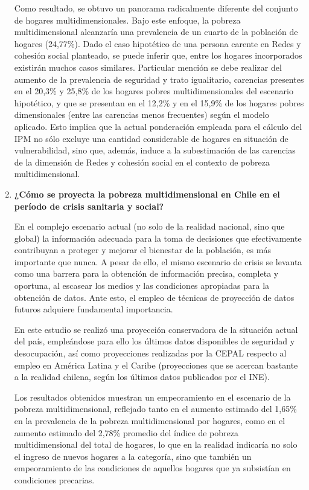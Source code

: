 \documentclass[12pt,letterpaper,spanish]{article}
\begin{document}
\begin{enumerate}
Como resultado, se obtuvo un panorama radicalmente diferente del conjunto de hogares multidimensionales. Bajo este enfoque, la pobreza multidimensional alcanzaría una prevalencia de un cuarto de la población de hogares (24,77\%). Dado el caso hipotético de una persona carente en Redes y cohesión social planteado, se puede inferir que, entre los hogares incorporados existirán muchos casos  similares. Particular mención se debe realizar del aumento de la prevalencia de seguridad y trato igualitario, carencias presentes  en el 20,3\% y 25,8\% de los hogares pobres multidimensionales del escenario hipotético, y que se presentan en el 12,2\% y en el 15,9\% de los hogares pobres dimensionales (entre las carencias menos frecuentes) según el modelo aplicado. Esto implica que la actual ponderación empleada para el cálculo del IPM no sólo excluye una cantidad considerable de hogares en situación de vulnerabilidad, sino que, además, induce a la subestimación de las carencias de la dimensión de Redes y cohesión social en el contexto de pobreza multidimensional.



\item \textbf{¿Cómo se proyecta la pobreza multidimensional en Chile en el período de crisis sanitaria y social?}

En el complejo escenario actual (no solo de la realidad nacional, sino que global) la información adecuada  para la toma de decisiones que efectivamente contribuyan a proteger y mejorar el bienestar de la población, es más importante que nunca. A pesar de ello, el mismo escenario de crisis se levanta como una barrera para la obtención de información precisa, completa y oportuna, al escasear los medios y las condiciones apropiadas para la obtención de datos. Ante esto, el empleo de técnicas de proyección de datos futuros adquiere fundamental importancia. 

En este estudio se realizó una proyección conservadora de la situación actual del país, empleándose para ello los últimos datos disponibles de seguridad y desocupación, así como proyecciones realizadas por la CEPAL respecto al empleo en América Latina y el Caribe (proyecciones que se acercan bastante a la realidad chilena, según los últimos datos publicados por el INE). 

Los resultados obtenidos muestran un empeoramiento en el escenario de la pobreza multidimensional, reflejado tanto en el aumento estimado del 1,65\%  en la prevalencia de la pobreza multidimensional por hogares, como en el aumento estimado del 2,78\% promedio del índice de pobreza multidimensional del total de hogares, lo que en la realidad indicaría no solo el ingreso de nuevos hogares a la categoría, sino que también un empeoramiento de las condiciones de aquellos hogares que ya subsistían en condiciones precarias.

\end{enumerate}
\end{document}
